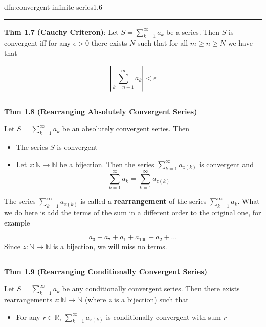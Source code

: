 \documentclass[landscape, 8pt]{extarticle}
\begin{document}
\begin{multicols}{3}
\begin{dfn}{dfn:convergent-infinite-series}{1.6}
	\vspace{-7pt}
	\noindent\rule{\textwidth}{0.2pt}
	\textbf{Thm 1.7 (Cauchy Criteron)}: Let $S=\sum_{k=1}^{\infty}a_{k}$ be a series. Then $S$ is convergent iff for any $\epsilon>0$ there exists $N$ such that for all $m\ge n\ge N$ we have that

	\vspace{-9pt}
	\[\left\lvert  \sum_{k=n+1}^{m} a_{k}  \right\rvert < \epsilon\]

	\noindent\rule{\textwidth}{0.2pt}

	\textbf{Thm 1.8 (Rearranging Absolutely Convergent Series)}

	Let $S=\sum_{k=1}^{\infty} a_{k}$ be an absolutely convergent series. Then

	\begin{itemize}
		\setlength\itemsep{0em}
		\item The series $S$ is convergent

		\item Let $z:\mathbb{N}\to \mathbb{N}$ be a bijection. Then the series $\sum_{k=1}^{\infty} a_{z(k)}$ is convergent and
			\vspace{-5pt}
			\[\sum_{k=1}^{\infty} a_{k} = \sum_{k=1}^{\infty} a_{z(k)} \]
	\end{itemize}

	\vspace{-5pt}
	The series $\sum_{k=1}^{\infty} a_{z(k)}$ is called a \textbf{rearrangement} of the series $\sum_{k=1}^{\infty} a_{k}$. What we do here is add the terms of the sum in a different order to the original one, for example

	\vspace{-8pt}
	\[a_{3} + a_{7}+ a_{1}+ a_{100} + a_{2} + \dots\]
	Since $z:\mathbb{N}\to \mathbb{N}$ is a bijection, we will miss no terms.

	\vspace{-5pt}
	\noindent\rule{\textwidth}{0.2pt}
	\textbf{Thm 1.9 (Rearranging Conditionally Convergent Series)}

	Let $S = \sum_{k=1}^{\infty} a_{k}$ be any conditionally convergent series. Then there exists rearrangements $z:\mathbb{N}\to \mathbb{N}$ (where $z$ is a bijection) such that

	\vspace{-5pt}
	\begin{itemize}[leftmargin=*]
		\setlength\itemsep{0em}
		\item For any $r\in\mathbb{R}$, $\sum_{k=1}^{\infty} a_{z(k)}$ is conditionally convergent with sum $r$


\end{itemize}
\end{dfn}
\end{multicols}
\end{document}
